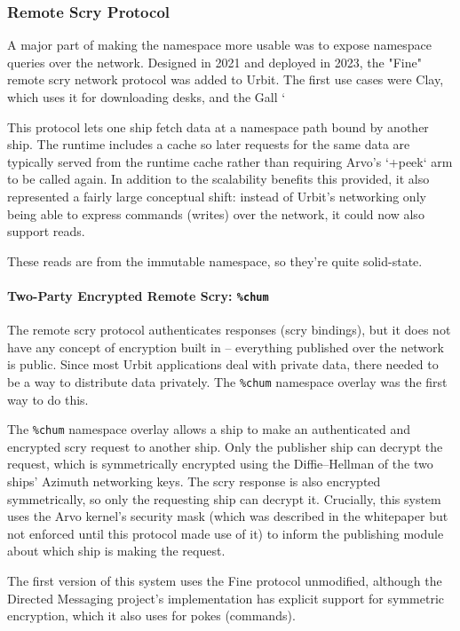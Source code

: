 \documentclass[twoside]{article}
\begin{document}
\subsubsection{Remote Scry Protocol}

A major part of making the namespace more usable was to expose namespace queries over the network.  Designed in 2021 and deployed in 2023, the "Fine" remote scry network protocol was added to Urbit.  The first use cases were Clay, which uses it for downloading desks, and the Gall `%

This protocol lets one ship fetch data at a namespace path bound by another ship.  The runtime includes a cache so later requests for the same data are typically served from the runtime cache rather than requiring Arvo's `+peek` arm to be called again.  In addition to the scalability benefits this provided, it also represented a fairly large conceptual shift: instead of Urbit's networking only being able to express commands (writes) over the network, it could now also support reads.

These reads are from the immutable namespace, so they're quite solid-state.

\paragraph{Two-Party Encrypted Remote Scry: \texttt{\%chum}}  The remote scry protocol authenticates responses (scry bindings), but it does not have any concept of encryption built in – everything published over the network is public.  Since most Urbit applications deal with private data, there needed to be a way to distribute data privately.  The \lstinline[style=inlinecode]{%chum} namespace overlay was the first way to do this.

The \lstinline[style=inlinecode]{%chum} namespace overlay allows a ship to make an authenticated and encrypted scry request to another ship.  Only the publisher ship can decrypt the request, which is symmetrically encrypted using the Diffie–Hellman of the two ships' Azimuth networking keys.  The scry response is also encrypted symmetrically, so only the requesting ship can decrypt it.  Crucially, this system uses the Arvo kernel's security mask (which was described in the whitepaper but not enforced until this protocol made use of it) to inform the publishing module about which ship is making the request.

The first version of this system uses the Fine protocol unmodified, although the Directed Messaging project's implementation has explicit support for symmetric encryption, which it also uses for pokes (commands).
\end{document}

